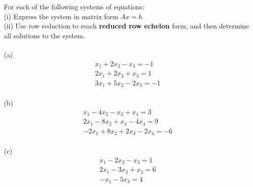 \begin{question}	\normalfont
	
For each of the following systems of equations: \\

\noindent (i) Express the system in matrix form $Ax =b$. \\

\noindent (ii) 	Use row reduction to reach {\bf reduced row echelon} form,
and then  determine all solutions to the
system.  \\ \\	
	
\noindent (a) 	
\[
\begin{array}{r}
x_1 + 2x_2 - x_3 = -1\\ 
2x_1 + 2x_2 + x_3 = 1 \\
3x_1 + 5x_2 - 2x_3 = -1 \\
\end{array}
\]

\vspace{.2cm}

\noindent (b)
\[
\begin{array}{r}
x_1 - 4x_2 - x_3 + x_4 = 3 \\
2x_1 - 8 x_2 + x_3 -4x_4 = 9 \\
-2x_1 + 8 x_2 + 2x_3 -2x_4 = -6 \\
\end{array}
\]	

\vspace{.2cm}

\noindent (c) 
\[
\begin{array}{r}
x_1 -2x_2 -x_3 = 1\\
2x_1 - 3x_2 + x_3 = 6 \\
-x_1 -5x_3 = 4 \\
\end{array}
\]


\end{question}